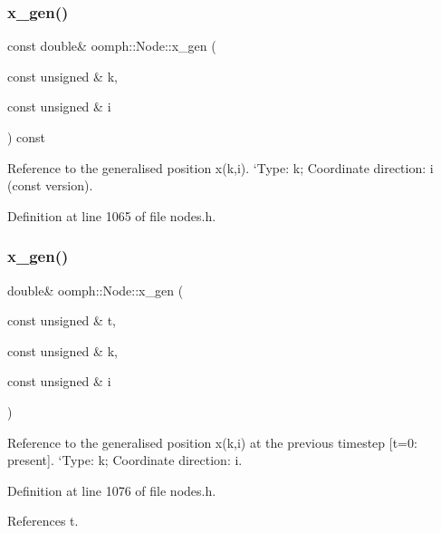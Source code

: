 \subsubsection{\texorpdfstring{x\+\_\+gen()}{x\_gen()}\hspace{0.1cm}{\footnotesize\ttfamily [2/4]}}
{\footnotesize\ttfamily const double\& oomph\+::\+Node\+::x\+\_\+gen (\begin{DoxyParamCaption}\item[{const unsigned \&}]{k,  }\item[{const unsigned \&}]{i }\end{DoxyParamCaption}) const\hspace{0.3cm}{\ttfamily [inline]}}



Reference to the generalised position x(k,i). `\+Type\textquotesingle{}\+: k; Coordinate direction\+: i (const version). 



Definition at line 1065 of file nodes.\+h.

\mbox{\label{classoomph_1_1Node_a121f57d5d84246cbd01c255dc1af49b5}} 
\subsubsection{\texorpdfstring{x\+\_\+gen()}{x\_gen()}\hspace{0.1cm}{\footnotesize\ttfamily [3/4]}}
{\footnotesize\ttfamily double\& oomph\+::\+Node\+::x\+\_\+gen (\begin{DoxyParamCaption}\item[{const unsigned \&}]{t,  }\item[{const unsigned \&}]{k,  }\item[{const unsigned \&}]{i }\end{DoxyParamCaption})\hspace{0.3cm}{\ttfamily [inline]}}



Reference to the generalised position x(k,i) at the previous timestep \mbox{[}t=0\+: present\mbox{]}. `\+Type\textquotesingle{}\+: k; Coordinate direction\+: i. 



Definition at line 1076 of file nodes.\+h.



References t.

